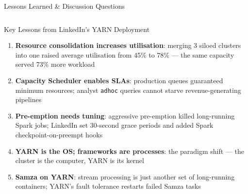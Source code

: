 \documentclass[aspectratio=169,10pt]{beamer}
\begin{document}
\begin{frame}{Lessons Learned \& Discussion Questions}
  \begin{columns}[T]
      \begin{block}{Key Lessons from LinkedIn's YARN Deployment}
        \begin{enumerate}
          \item \textbf{Resource consolidation increases utilisation}:
                merging 3 siloed clusters into one raised average
                utilisation from 45\% to 78\%
                — the same capacity served 73\% more workload
          \item \textbf{Capacity Scheduler enables SLAs}:
                production queues guaranteed minimum resources;
                analyst \texttt{adhoc} queries cannot starve
                revenue-generating pipelines
          \item \textbf{Pre-emption needs tuning}: aggressive
                pre-emption killed long-running Spark jobs;
                LinkedIn set 30-second grace periods and added
                Spark checkpoint-on-preempt hooks
          \item \textbf{YARN is the OS; frameworks are processes}:
                the paradigm shift — the cluster is the computer,
                YARN is its kernel
          \item \textbf{Samza on YARN}: stream processing is
                just another set of long-running containers;
                YARN's fault tolerance restarts failed Samza tasks
        \end{enumerate}
      \end{block}


\end{columns}
\end{frame}
\end{document}
